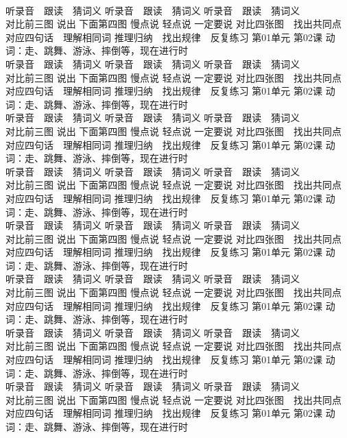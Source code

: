 \documentclass[8pt]{extreport}
\begin{document}
\begin{CJK}{UTF8}{min}
\\	听录音　跟读　猜词义 听录音　跟读　猜词义 听录音　跟读　猜词义 
\\	对比前三图 说出 下面第四图 慢点说 轻点说 一定要说	对比四张图　找出共同点 对应四句话　理解相同词 推理归纳　找出规律　反复练习 第01单元 第02课 动词：走、跳舞、游泳、摔倒等，现在进行时
\\	听录音　跟读　猜词义 听录音　跟读　猜词义 听录音　跟读　猜词义 
\\	对比前三图 说出 下面第四图 慢点说 轻点说 一定要说	对比四张图　找出共同点 对应四句话　理解相同词 推理归纳　找出规律　反复练习 第01单元 第02课 动词：走、跳舞、游泳、摔倒等，现在进行时
\\	听录音　跟读　猜词义 听录音　跟读　猜词义 听录音　跟读　猜词义 
\\	对比前三图 说出 下面第四图 慢点说 轻点说 一定要说	对比四张图　找出共同点 对应四句话　理解相同词 推理归纳　找出规律　反复练习 第01单元 第02课 动词：走、跳舞、游泳、摔倒等，现在进行时
\\	听录音　跟读　猜词义 听录音　跟读　猜词义 听录音　跟读　猜词义 
\\	对比前三图 说出 下面第四图 慢点说 轻点说 一定要说	对比四张图　找出共同点 对应四句话　理解相同词 推理归纳　找出规律　反复练习 第01单元 第02课 动词：走、跳舞、游泳、摔倒等，现在进行时
\\	听录音　跟读　猜词义 听录音　跟读　猜词义 听录音　跟读　猜词义 
\\	对比前三图 说出 下面第四图 慢点说 轻点说 一定要说	对比四张图　找出共同点 对应四句话　理解相同词 推理归纳　找出规律　反复练习 第01单元 第02课 动词：走、跳舞、游泳、摔倒等，现在进行时
\\	听录音　跟读　猜词义 听录音　跟读　猜词义 听录音　跟读　猜词义 
\\	对比前三图 说出 下面第四图 慢点说 轻点说 一定要说	对比四张图　找出共同点 对应四句话　理解相同词 推理归纳　找出规律　反复练习 第01单元 第02课 动词：走、跳舞、游泳、摔倒等，现在进行时
\\	听录音　跟读　猜词义 听录音　跟读　猜词义 听录音　跟读　猜词义 
\\	对比前三图 说出 下面第四图 慢点说 轻点说 一定要说	对比四张图　找出共同点 对应四句话　理解相同词 推理归纳　找出规律　反复练习 第01单元 第02课 动词：走、跳舞、游泳、摔倒等，现在进行时
\\	听录音　跟读　猜词义 听录音　跟读　猜词义 听录音　跟读　猜词义 
\\	对比前三图 说出 下面第四图 慢点说 轻点说 一定要说	对比四张图　找出共同点 对应四句话　理解相同词 推理归纳　找出规律　反复练习 第01单元 第02课 动词：走、跳舞、游泳、摔倒等，现在进行时

\end{CJK}
\end{document}

